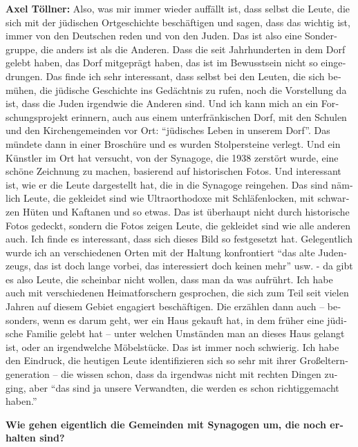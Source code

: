 \begin{otherlanguage}{ngerman}
\textbf{Axel Töllner:} Also, was mir immer wieder auffällt ist, dass selbst die Leute, die sich mit der jüdischen Ortgeschichte beschäftigen und sagen, dass das wichtig ist, immer von den Deutschen reden und von den Juden. Das ist also eine Sondergruppe, die anders ist als die Anderen. Dass die seit Jahrhunderten in dem Dorf gelebt haben, das Dorf mitgeprägt haben, das ist im Bewusstsein nicht so eingedrungen. Das finde ich sehr interessant, dass selbst bei den Leuten, die sich bemühen, die jüdische Geschichte ins Gedächtnis zu rufen, noch die Vorstellung da ist, dass die Juden irgendwie die Anderen sind.  
Und ich kann mich an ein Forschungsprojekt erinnern, auch aus einem unterfränkischen Dorf, mit den Schulen und den Kirchengemeinden vor Ort: "`jüdisches Leben in unserem Dorf"'. Das mündete dann in einer Broschüre und es wurden Stolpersteine verlegt. Und ein Künstler im Ort hat versucht, von der Synagoge, die 1938 zerstört wurde, eine schöne Zeichnung zu machen, basierend auf historischen Fotos. Und interessant ist, wie er die Leute dargestellt hat, die in die Synagoge reingehen. Das sind nämlich Leute, die gekleidet sind wie Ultraorthodoxe mit Schläfenlocken, mit schwarzen Hüten und Kaftanen und so etwas. Das ist überhaupt nicht durch historische Fotos gedeckt, sondern die Fotos zeigen Leute, die gekleidet sind wie alle anderen auch. Ich finde es interessant, dass sich dieses Bild so festgesetzt hat. 
Gelegentlich wurde ich an verschiedenen Orten mit der Haltung konfrontiert "`das alte Judenzeugs, das ist doch lange vorbei, das interessiert doch keinen mehr"' usw. - da gibt es also Leute, die scheinbar nicht wollen, dass man da was aufrührt. Ich habe auch mit verschiedenen Heimatforschern gesprochen, die sich zum Teil seit vielen Jahren auf diesem Gebiet engagiert beschäftigen. Die erzählen dann auch – besonders, wenn es darum geht, wer ein Haus gekauft hat, in dem früher eine jüdische Familie gelebt hat – unter welchen Umständen man an dieses Haus gelangt ist, oder an irgendwelche Möbelstücke. Das ist immer noch schwierig.  
Ich habe den Eindruck, die heutigen Leute identifizieren sich so sehr mit ihrer Großelterngeneration – die wissen schon, dass da irgendwas nicht mit rechten Dingen zuging, aber "`das sind ja unsere Verwandten, die werden es schon richtiggemacht haben."' 

\textbf{Wie gehen eigentlich die Gemeinden mit Synagogen um, die noch erhalten sind?} 


\end{otherlanguage}
